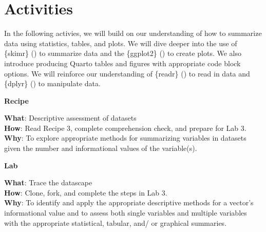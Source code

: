 \documentclass[
  letterpaper,
  krantz1]{latex/krantz-mod}
\theoremstyle{definition}
\theoremstyle{definition}
\theoremstyle{remark}
\begin{document}
\section*{Activities}\label{activities-1}


In the following activies, we will build on our understanding of how to
summarize data using statistics, tables, and plots. We will dive deeper
into the use of \{skimr\} ()
to summarize data and the \{ggplot2\} () to create plots. We also introduce producing
Quarto tables and figures with appropriate code block options. We will
reinforce our understanding of \{readr\}
() to read in
data and \{dplyr\} () to manipulate data.

\begin{tcolorbox}[enhanced jigsaw, leftrule=.75mm, colframe=quarto-callout-color-frame, left=2mm, colback=white, toprule=.15mm, breakable, arc=.35mm, opacityback=0, bottomrule=.15mm, rightrule=.15mm]

\textbf{ Recipe}

\textbf{What}: Descriptive assessment of datasets\\
\textbf{How}: Read Recipe 3, complete comprehension check, and prepare
for Lab 3.\\
\textbf{Why}: To explore appropriate methods for summarizing variables
in datasets given the number and informational values of the
variable(s).

\end{tcolorbox}

\begin{tcolorbox}[enhanced jigsaw, leftrule=.75mm, colframe=quarto-callout-color-frame, left=2mm, colback=white, toprule=.15mm, breakable, arc=.35mm, opacityback=0, bottomrule=.15mm, rightrule=.15mm]

\textbf{ Lab}

\textbf{What}: Trace the datascape\\
\textbf{How}: Clone, fork, and complete the steps in Lab 3.\\
\textbf{Why}: To identify and apply the appropriate descriptive methods
for a vector's informational value and to assess both single variables
and multiple variables with the appropriate statistical, tabular, and/
or graphical summaries.

\end{tcolorbox}
\end{document}
